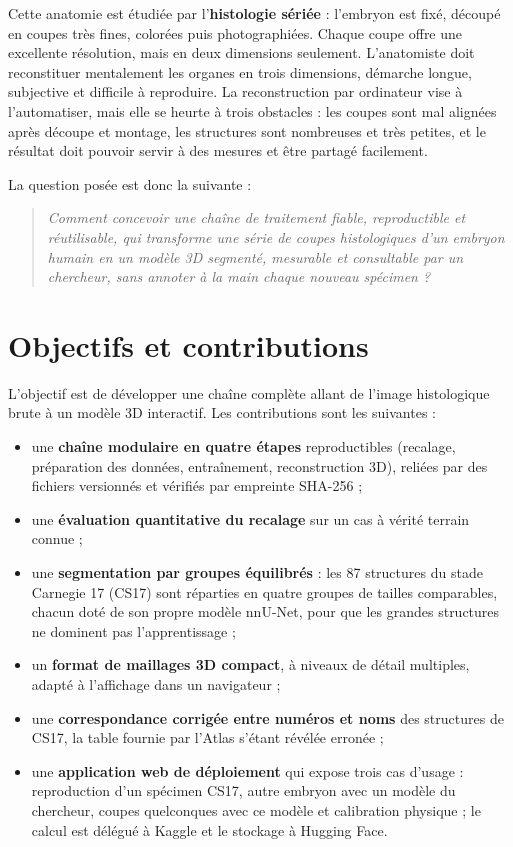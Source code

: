\documentclass[12pt,a4paper]{report}
\begin{document}
Cette anatomie est étudiée par l'\textbf{histologie sériée} : l'embryon est fixé, découpé en coupes très fines, colorées puis photographiées. Chaque coupe offre une excellente résolution, mais en deux dimensions seulement. L'anatomiste doit reconstituer mentalement les organes en trois dimensions, démarche longue, subjective et difficile à reproduire. La reconstruction par ordinateur vise à l'automatiser, mais elle se heurte à trois obstacles : les coupes sont mal alignées après découpe et montage, les structures sont nombreuses et très petites, et le résultat doit pouvoir servir à des mesures et être partagé facilement.

La question posée est donc la suivante :
\begin{quote}
\textit{Comment concevoir une chaîne de traitement fiable, reproductible et réutilisable, qui transforme une série de coupes histologiques d'un embryon humain en un modèle 3D segmenté, mesurable et consultable par un chercheur, sans annoter à la main chaque nouveau spécimen ?}
\end{quote}

\section{Objectifs et contributions}

L'objectif est de développer une chaîne complète allant de l'image histologique brute à un modèle 3D interactif. Les contributions sont les suivantes :
\begin{itemize}
    \item une \textbf{chaîne modulaire en quatre étapes} reproductibles (recalage, préparation des données, entraînement, reconstruction 3D), reliées par des fichiers versionnés et vérifiés par empreinte SHA-256 ;
    \item une \textbf{évaluation quantitative du recalage} sur un cas à vérité terrain connue ;
    \item une \textbf{segmentation par groupes équilibrés} : les 87 structures du stade Carnegie 17 (CS17) sont réparties en quatre groupes de tailles comparables, chacun doté de son propre modèle nnU-Net, pour que les grandes structures ne dominent pas l'apprentissage ;
    \item un \textbf{format de maillages 3D compact}, à niveaux de détail multiples, adapté à l'affichage dans un navigateur ;
    \item une \textbf{correspondance corrigée entre numéros et noms} des structures de CS17, la table fournie par l'Atlas s'étant révélée erronée ;
    \item une \textbf{application web de déploiement} qui expose trois cas d'usage : reproduction d'un spécimen CS17, autre embryon avec un modèle du chercheur, coupes quelconques avec ce modèle et calibration physique ; le calcul est délégué à Kaggle et le stockage à Hugging Face.
\end{itemize}
\end{document}
